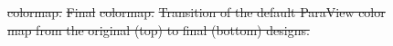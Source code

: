 \documentclass{IEEEcsmag}
\newcommand*{\colormap}[1]{\textsl{#1}\xspace}
\newcommand*{\blueorange}{\colormap{Blue-Orange Diverging}}
\newcommand*{\fast}{\colormap{Fast}}
\providecommand{\DIFdeltex}[1]{{\protect\color{red}\sout{#1}}}                      %
\providecommand{\DIFdelFL}[1]{\DIFdel{#1}} %
\providecommand{\DIFaddbeginFL}{} %
\providecommand{\DIFaddendFL}{} %
\providecommand{\DIFdelendFL}{} %
\providecommand{\DIFdel}[1]{\texorpdfstring{\DIFdeltex{#1}}{}} %
\begin{document}
\begin{figure}[t]
{%
\DIFdelFL{colormap.}}
{%
\DIFdelFL{Final }%
\DIFdelFL{colormap.}}
{%
\DIFdelFL{Transition of the default ParaView color map from the original (top) to final (bottom) designs.
  }}
\DIFdelendFL \DIFaddbeginFL \label{CCC1}
\DIFaddendFL \end{figure}
\end{document}
